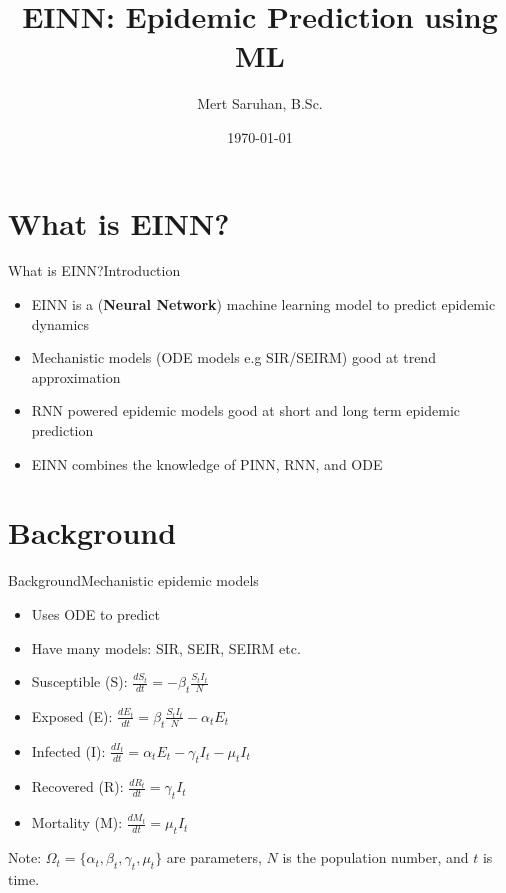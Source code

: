 \documentclass[
	aspectratio=169,	%
	onlytextwidth,		%
	t,					%
	]{beamer}
\title[EINN: Epidemic Prediction using ML]{EINN: Epidemic Prediction using ML}
\subtitle{}
\author[Mert Saruhan]{Mert Saruhan, B.Sc.}
\date{\today} %
\begin{document}
\section{What is EINN?}

\begin{frame}[fragile]{What is EINN?}{Introduction}

	\begin{itemize}
		\item<1-> EINN is a (\textbf{Neural Network}) machine learning model to predict epidemic dynamics~\cite{main}
		\item <2-> Mechanistic models (ODE models e.g SIR/SEIRM) good at trend approximation~\cite{main}
		\item <3-> RNN powered epidemic models good at short and long term epidemic prediction~\cite{main}
		\item<4-> EINN combines the knowledge of PINN, RNN, and ODE~\cite{main}
	\end{itemize}

\end{frame}

\section{Background}

\begin{frame}[fragile]{Background}{Mechanistic epidemic models}
	\begin{itemize}
		\item<1-> Uses ODE to predict
		\item<2-> Have many models: SIR, SEIR, SEIRM etc.
		\item<3-> Susceptible (S): $\frac{dS_{t}}{dt} = - \beta_{t} \frac{S_{t}I_{t}}{N}$
		\item<4-> Exposed (E): $\frac{dE_{t}}{dt} = \beta_{t} \frac{S_{t}I_{t}}{N} - \alpha_{t}E_{t}$
		\item<5-> Infected (I): $\frac{dI_{t}}{dt} = \alpha_{t}E_{t} - \gamma_{t}I_{t} - \mu_{t}I_{t}$
		\item<6-> Recovered (R): $ \frac{dR_{t}}{dt} = \gamma_{t} I_{t}$
		\item<7-> Mortality (M): $\frac{dM_{t}}{dt} = \mu_{t}I_{t}$
	\end{itemize}
	\vfill
	Note: $\Omega_{t} =\{\alpha_{t}, \beta_{t}, \gamma_{t}, \mu_{t} \}$ are parameters, $N$ is the population number, and $t$ is time.

\end{frame}
\end{document}
